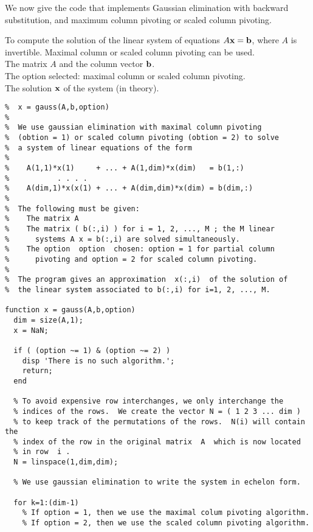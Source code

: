 We now give the code that implements Gaussian elimination with backward
substitution, and maximum column pivoting or scaled column pivoting.

\begin{code}
To compute the solution of the linear system of equations
$A\mathbf{x} = \mathbf{b}$, where $A$ is invertible.  Maximal column or
scaled column pivoting can be used.\\
 The matrix $A$ and the column vector $\mathbf{b}$.\\
The option selected: maximal column or scaled column
pivoting.\\
 The solution $\mathbf{x}$ of the system (in theory).
\small
\begin{verbatim}
%  x = gauss(A,b,option)
%
%  We use gaussian elimination with maximal column pivoting
%  (obtion = 1) or scaled column pivoting (obtion = 2) to solve
%  a system of linear equations of the form
%
%    A(1,1)*x(1)     + ... + A(1,dim)*x(dim)   = b(1,:)
%           . . . .
%    A(dim,1)*x(x(1) + ... + A(dim,dim)*x(dim) = b(dim,:)
%
%  The following must be given:
%    The matrix A
%    The matrix ( b(:,i) ) for i = 1, 2, ..., M ; the M linear
%      systems A x = b(:,i) are solved simultaneously.
%    The option  option  chosen: option = 1 for partial column
%      pivoting and option = 2 for scaled column pivoting.
%
%  The program gives an approximation  x(:,i)  of the solution of
%  the linear system associated to b(:,i) for i=1, 2, ..., M.

function x = gauss(A,b,option)
  dim = size(A,1);
  x = NaN;

  if ( (option ~= 1) & (option ~= 2) )
    disp 'There is no such algorithm.';
    return;
  end

  % To avoid expensive row interchanges, we only interchange the
  % indices of the rows.  We create the vector N = ( 1 2 3 ... dim )
  % to keep track of the permutations of the rows.  N(i) will contain the
  % index of the row in the original matrix  A  which is now located
  % in row  i .
  N = linspace(1,dim,dim);

  % We use gaussian elimination to write the system in echelon form.

  for k=1:(dim-1)
    % If option = 1, then we use the maximal colum pivoting algorithm.
    % If option = 2, then we use the scaled column pivoting algorithm.


\end{verbatim}
\end{code}
